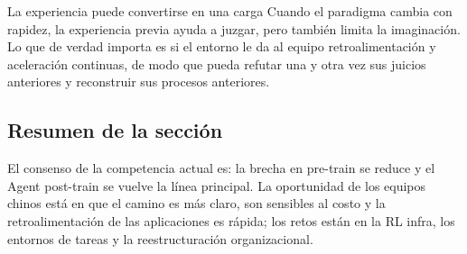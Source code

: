 \begin{warningbox}{La experiencia puede convertirse en una carga}
Cuando el paradigma cambia con rapidez, la experiencia previa ayuda a juzgar, pero también limita la imaginación. Lo que de verdad importa es si el entorno le da al equipo retroalimentación y aceleración continuas, de modo que pueda refutar una y otra vez sus juicios anteriores y reconstruir sus procesos anteriores.
\end{warningbox}

\subsection{Resumen de la sección}

El consenso de la competencia actual es: la brecha en pre-train se reduce y el Agent post-train se vuelve la línea principal. La oportunidad de los equipos chinos está en que el camino es más claro, son sensibles al costo y la retroalimentación de las aplicaciones es rápida; los retos están en la RL infra, los entornos de tareas y la reestructuración organizacional.
